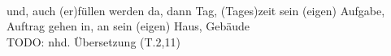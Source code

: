 \begin{exe}
\ex \label{ex:T141} \gll {}             \\
{und, auch} {(er)füllen} {werden} {da, dann} {Tag, (Tages)zeit} {sein (eigen)} {Aufgabe, Auftrag} {} {gehen} {in, an} {sein (eigen)} {Haus, Gebäude} {}\\
\glt TODO: nhd. Übersetzung (T.2,11)
\end{exe}
